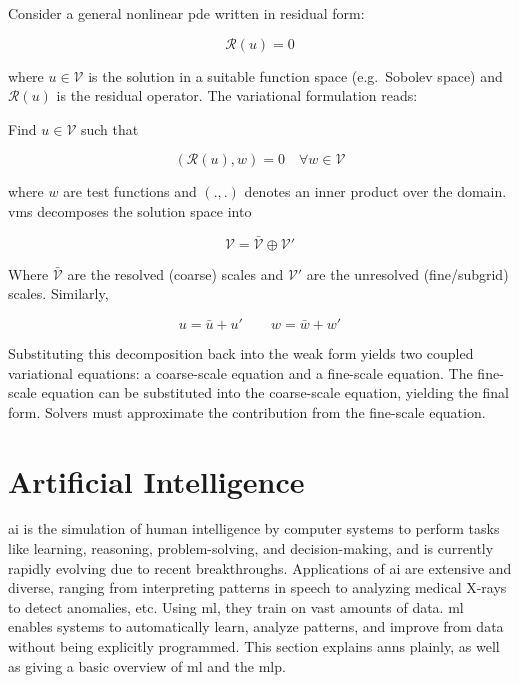 Consider a general nonlinear \gls{pde} written in residual form:

\begin{equation} \label{eq:vms_residual}
    \mathcal{R}(u) = 0
\end{equation}

where $u \in \mathcal{V}$ is the solution in a suitable function space (e.g.\ Sobolev space) and $\mathcal{R}(u)$ is the residual operator.
The variational formulation reads:

\noindent Find $u \in \mathcal{V}$ such that

\begin{equation} \label{eq:vms_formulation}
    (\mathcal{R}(u), w) = 0 \quad \forall w \in \mathcal{V}
\end{equation}

where $w$ are test functions and $(.,.)$ denotes an inner product over the domain. \gls{vms} decomposes the solution space into

\begin{equation} \label{eq:solution_space}
    \mathcal{V} = \bar{\mathcal{V}} \oplus \mathcal{V}'
\end{equation}

Where $\bar{\mathcal{V}}$ are the resolved (coarse) scales and $\mathcal{V}'$ are the unresolved (fine/subgrid) scales.
Similarly,

\begin{equation} \label{eq:vms_split}
    u = \bar{u} + u' \qquad w = \bar{w} + w'
\end{equation}

Substituting this decomposition back into the weak form yields two coupled variational equations: a coarse-scale equation and a fine-scale equation.
The fine-scale equation can be substituted into the coarse-scale equation, yielding the final form.
Solvers must approximate the contribution from the fine-scale equation.

\section{Artificial Intelligence} \label{sec:ai}


\gls{ai} is the simulation of human intelligence by computer systems to perform tasks like learning, reasoning, problem-solving, and decision-making, and is currently rapidly evolving due to recent breakthroughs.
Applications of \gls{ai} are extensive and diverse, ranging from interpreting patterns in speech to analyzing medical X-rays to detect anomalies, etc.
Using \gls{ml}, they train on vast amounts of data. \gls{ml} enables systems to automatically learn, analyze patterns, and improve from data without being explicitly programmed.
This section explains \gls{ann}s plainly, as well as giving a basic overview of \gls{ml} and the \gls{mlp}.

